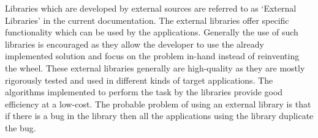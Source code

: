 Libraries which are developed by external sources are referred to as {\lq}External Libraries{\rq} in the current documentation. The external libraries offer specific functionality which can be used by the applications. Generally the use of such libraries is encouraged as they allow the developer to use the already implemented solution and focus on the problem in-hand instead of reinventing the wheel. These external libraries generally are high-quality as they are mostly rigorously tested and used in different kinds of target applications. The algorithms implemented to perform the task by the libraries provide good efficiency at a low-cost. The probable problem of using an external library is that if there is a bug in the library then all the applications using the library duplicate the bug. \newline

